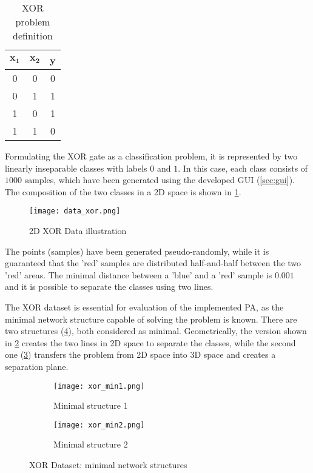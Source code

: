 \begin{table}[H]
\centering
\caption{XOR problem definition}
\label{tab:xor}
\begin{tabular}{|c|c|c|}
\hline
$ \mathbf{x_1} $ & $ \mathbf{x_2} $ & \textbf{y} \\ \hline
0           & 0           & 0          \\ \hline
0           & 1           & 1          \\ \hline
1           & 0           & 1          \\ \hline
1           & 1           & 0          \\ \hline
\end{tabular}
\end{table}

Formulating the XOR gate as a classification problem, it is represented by two linearly inseparable classes with labels $ 0 $ and $ 1 $. In this case, each class consists of $ 1000 $ samples, which have been generated using the developed GUI (\cref{sec:gui}). The composition of the two classes in a 2D space is shown in \cref{img:data_xor}.

\begin{figure}[H]
  \centering
  \texttt{[image: data\_xor.png]}
  \caption{2D XOR Data illustration}
  \label{img:data_xor}
\end{figure}

The points (samples) have been generated pseudo-randomly, while it is guaranteed that the 'red' samples are distributed half-and-half between the two 'red' areas. The minimal distance between a 'blue' and a 'red' sample is $ 0.001 $ and it is possible to separate the classes using two lines.

The XOR dataset is essential for evaluation of the implemented PA, as the minimal network structure capable of solving the problem is known. There are two structures (\cref{img:xor_min}), both considered as minimal. Geometrically, the version shown in \cref{img:xor_min1} creates the two lines in 2D space to separate the classes, while the second one (\cref{img:xor_min2}) transfers the problem from 2D space into 3D space and creates a separation plane.

\begin{figure}[H]
\centering
\begin{subfigure}{.5\textwidth}
  \centering
  \texttt{[image: xor\_min1.png]}
  \caption{Minimal structure 1}
  \label{img:xor_min1}
\end{subfigure}%
\begin{subfigure}{.5\textwidth}
  \centering
  \texttt{[image: xor\_min2.png]}
  \caption{Minimal structure 2}
  \label{img:xor_min2}
\end{subfigure}
\caption{XOR Dataset: minimal network structures}
\label{img:xor_min}
\end{figure}

